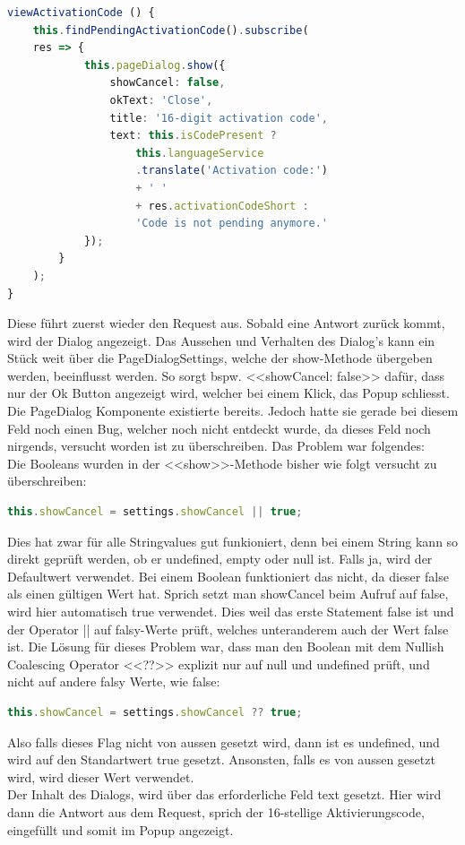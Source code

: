 \begin{lstlisting}[language=TypeScript]
viewActivationCode () {
	this.findPendingActivationCode().subscribe(
	res => {
			this.pageDialog.show({
				showCancel: false,
				okText: 'Close',
				title: '16-digit activation code',
				text: this.isCodePresent ?
					this.languageService
					.translate('Activation code:')
					+ ' '
					+ res.activationCodeShort :
					'Code is not pending anymore.'
			});
		}
	);
}
\end{lstlisting}
Diese führt zuerst wieder den Request aus. Sobald eine Antwort zurück kommt, wird der Dialog angezeigt. Das Aussehen und Verhalten des Dialog's kann ein Stück weit über die PageDialogSettings, welche der show-Methode übergeben werden, beeinflusst werden. So sorgt bspw. <<showCancel: false>> dafür, dass nur der Ok Button angezeigt wird, welcher bei einem Klick, das Popup schliesst. Die PageDialog Komponente existierte bereits. Jedoch hatte sie gerade bei diesem Feld noch einen Bug, welcher noch nicht entdeckt wurde, da dieses Feld noch nirgends, versucht worden ist zu überschreiben. Das Problem war folgendes:\\
Die Booleans wurden in der <<show>>-Methode bisher wie folgt versucht zu überschreiben:
\begin{lstlisting}[language=TypeScript]
this.showCancel = settings.showCancel || true;
\end{lstlisting}
Dies hat zwar für alle Stringvalues gut funkioniert, denn bei einem String kann so direkt geprüft werden, ob er undefined, empty oder null ist. Falls ja, wird der Defaultwert verwendet.
Bei einem Boolean funktioniert das nicht, da dieser false als einen gültigen Wert hat. Sprich setzt man showCancel beim Aufruf auf false, wird hier automatisch true verwendet. Dies weil das erste Statement false ist und der Operator || auf falsy-Werte prüft, welches unteranderem auch der Wert false ist. Die Lösung für dieses Problem war, dass man den Boolean mit dem Nullish Coalescing Operator <<??>> explizit nur auf null und undefined prüft, und nicht auf andere falsy Werte, wie false:
\begin{lstlisting}[language=TypeScript]
this.showCancel = settings.showCancel ?? true;
\end{lstlisting}
Also falls dieses Flag nicht von aussen gesetzt wird, dann ist es undefined, und wird auf den Standartwert true gesetzt. Ansonsten, falls es von aussen gesetzt wird, wird dieser Wert verwendet.
\\
Der Inhalt des Dialogs, wird über das erforderliche Feld \flqq text\frqq{} gesetzt. Hier wird dann die Antwort aus dem Request, sprich der 16-stellige Aktivierungscode, eingefüllt und somit im Popup angezeigt.

